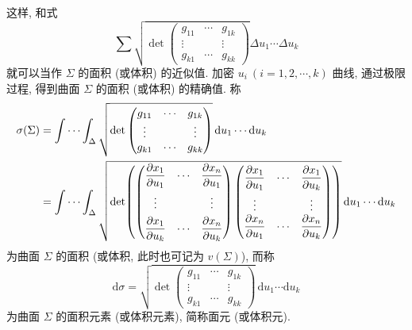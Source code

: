 \begin{definition}
这样, 和式
\[
  \sum \sqrt{\operatorname{det}\begin{pmatrix}
    g_{11} & \cdots & g_{1 k} \\
    \vdots & & \vdots \\
    g_{k 1} & \cdots & g_{k k}
  \end{pmatrix}} \Delta u_{1} \cdots \Delta u_{k}
\]
就可以当作 $\Sigma$ 的面积 (或体积) 的近似值. 加密 $u_{i}\ (i=1,2, \cdots, k)$ 曲线, 通过极限过程, 得到曲面 $\Sigma$ 的面积 (或体积) 的精确值. 称
\begin{align*}
  \sigma(\Sigma) &=\idotsint_{\Delta} \sqrt{\operatorname{det}\begin{pmatrix}
      g_{11} & \cdots & g_{1 k} \\
      \vdots & & \vdots \\
      g_{k 1} & \cdots & g_{k k}
    \end{pmatrix}}\,\mathrm{d} u_{1} \cdots \mathrm{d} u_{k} \\
  &=\idotsint_{\Delta} \sqrt{\operatorname{det}\!\left(\begin{pmatrix}
      \dfrac{\partial x_{1}}{\partial u_{1}} & \cdots & \dfrac{\partial x_{n}}{\partial u_{1}} \\[8pt]
      \vdots & & \vdots \\[4pt]
      \dfrac{\partial x_{1}}{\partial u_{k}} & \cdots & \dfrac{\partial x_{n}}{\partial u_{k}}
    \end{pmatrix}
    \begin{pmatrix}
      \dfrac{\partial x_{1}}{\partial u_{1}} & \cdots & \dfrac{\partial x_{1}}{\partial u_{k}} \\[8pt]
      \vdots & & \vdots \\
      \dfrac{\partial x_{n}}{\partial u_{1}} & \cdots & \dfrac{\partial x_{n}}{\partial u_{k}}
    \end{pmatrix}\right)}\,\mathrm{d} u_{1} \cdots \mathrm{d} u_{k}
\end{align*}
为曲面 $\Sigma$ 的面积 (或体积, 此时也可记为 $v(\Sigma)$), 而称
\[
  \mathrm{d} \sigma=\sqrt{\operatorname{det}\begin{pmatrix}
    g_{11} & \cdots & g_{1 k} \\
    \vdots & & \vdots \\
    g_{k 1} & \cdots & g_{k k}
  \end{pmatrix}}\,\mathrm{d} u_{1} \cdots \mathrm{d} u_{k}
\]
为曲面 $\Sigma$ 的面积元素 (或体积元素), 简称面元 (或体积元).


\end{definition}

